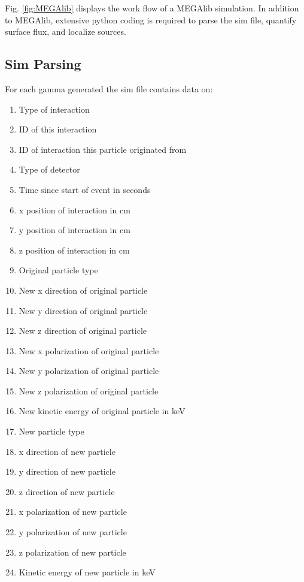Fig. \ref{fig:MEGAlib} displays the work flow of a MEGAlib simulation. In addition to MEGAlib, extensive python coding is required to parse the sim file, quantify surface flux, and localize sources.

\subsection{Sim Parsing}
\noindent For each gamma generated the sim file contains data on:

\begin{enumerate}
	\item Type of interaction
  \item ID of this interaction
  \item ID of interaction this particle originated from
  \item Type of detector
  \item Time since start of event in seconds
  \item x position of interaction in cm
  \item y position of interaction in cm
  \item z position of interaction in cm
  \item Original particle type
  \item New x direction of original particle
  \item New y direction of original particle
  \item New z direction of original particle
  \item New x polarization of original particle
  \item New y polarization of original particle
  \item New z polarization of original particle
  \item New kinetic energy of original particle in keV
  \item New particle type
  \item x direction of new particle
  \item y direction of new particle
  \item z direction of new particle
  \item x polarization of new particle
  \item y polarization of new particle
  \item z polarization of new particle
  \item Kinetic energy of new particle in keV
\end{enumerate}

